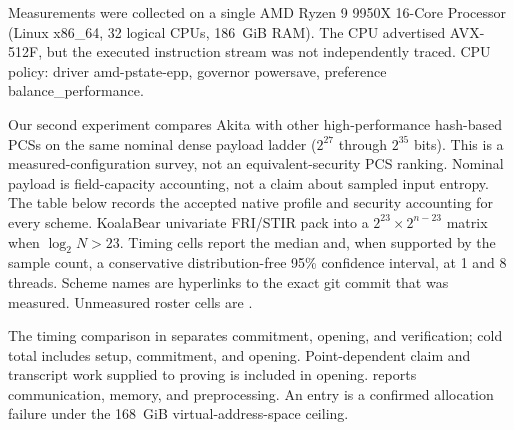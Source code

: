 Measurements were collected on a single AMD Ryzen 9 9950X 16-Core Processor (Linux x86\_64, 32 logical CPUs, 186~GiB RAM). The CPU advertised AVX-512F, but the executed instruction stream was not independently traced. CPU policy: driver amd-pstate-epp, governor powersave, preference balance\_performance.

Our second experiment compares Akita with other high-performance hash-based PCSs
on the same nominal dense payload ladder ($2^{27}$ through $2^{35}$ bits).
This is a measured-configuration survey, not an equivalent-security PCS ranking.
Nominal payload is field-capacity accounting, not a claim about sampled input entropy.
The table below records the accepted native profile and security accounting for every scheme.
KoalaBear univariate FRI/STIR pack into a $2^{23}\times 2^{n-23}$ matrix when $\log_2 N>23$. Timing cells
report the median and, when supported by the sample count, a conservative distribution-free 95\% confidence interval,
at 1 and 8 threads. Scheme names are hyperlinks to the exact git commit that was
measured. Unmeasured roster cells are \evalpending{}.

The timing comparison in  separates commitment,
opening, and verification; cold total includes setup, commitment, and opening.
Point-dependent claim and transcript work supplied to proving is included in opening.
 reports
communication, memory, and preprocessing. An \evaloom{} entry is a confirmed allocation failure under the 168~GiB virtual-address-space ceiling.

